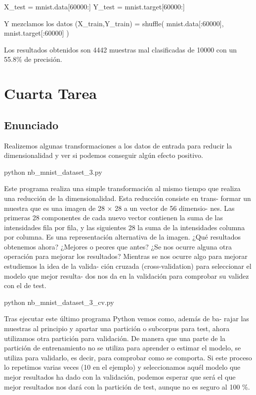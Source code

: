 \documentclass[12pt,twoside]{article}
\begin{document}
\begin{enumerate}[(a)]
X_test = mnist.data[60000:]
Y_test = mnist.target[60000:]

Y mezclamos los datos
(X_train,Y_train) = shuffle( mnist.data[:60000], mnist.target[:60000] )

Los resultados obtenidos son 4442 muestras mal clasificadas de 10000 con un 55.8\% de precisión.

\section{Cuarta Tarea}

\subsection{Enunciado}

\noindent
Realizemos algunas transformaciones a los datos de entrada para reducir
la dimensionalidad y ver si podemos conseguir algún efecto positivo.
\begin{center}
python nb_mnist_dataset_3.py
\end{center}

Este programa realiza una simple transformación al mismo tiempo que
realiza una reducción de la dimensionalidad. Esta reducción consiste en trans-
formar un muestra que es una imagen de 28 × 28 a un vector de 56 dimensio-
nes. Las primeras 28 componentes de cada nuevo vector contienen la suma
de las intensidades fila por fila, y las siguientes 28 la suma de la intensidades
columna por columna. Es una representación alternativa de la imagen.
¿Qué resultados obtenemos ahora? ¿Mejores o peores que antes? ¿Se nos
ocurre alguna otra operación para mejorar los resultados?
Mientras se nos ocurre algo para mejorar estudiemos la idea de la valida-
ción cruzada (cross-validation) para seleccionar el modelo que mejor resulta-
dos nos da en la validación para comprobar su validez con el de test.

\begin{center}
python nb_mnist_dataset_3_cv.py
\end{center}

Tras ejecutar este último programa Python vemos como, además de ba-
rajar las muestras al principio y apartar una partición o subcorpus para test,
ahora utilizamos otra partición para validación. De manera que una parte de
la partición de entrenamiento no se utiliza para aprender o estimar el modelo,
se utiliza para validarlo, es decir, para comprobar como se comporta. Si este
proceso lo repetimos varias veces (10 en el ejemplo) y seleccionamos aquél
modelo que mejor resultados ha dado con la validación, podemos esperar que
será el que mejor resultados nos dará con la partición de test, aunque no es
seguro al 100 \%.


\end{enumerate}
\end{document}
